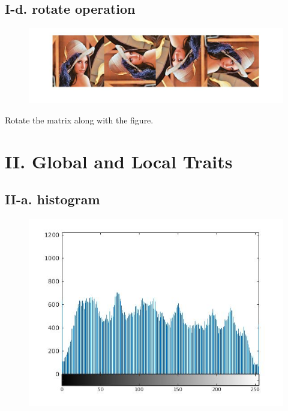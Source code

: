 \documentclass[twoside,a4paper]{article}
\begin{document}
\subsection*{I-d. rotate operation}
\begin{figure}[H]
\centering
\includegraphics[width=7in]{rotate.jpg}
\end{figure}
Rotate the matrix along with the figure.
\section*{II. Global and Local Traits}
\subsection*{II-a. histogram}
\begin{figure}[H]
\centering
\includegraphics[width=6in]{hist.jpg}
\end{figure}
\end{document}
